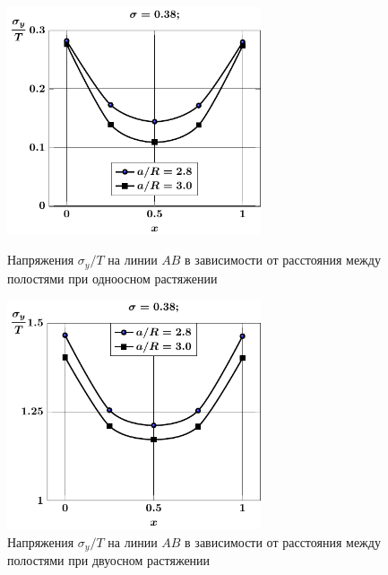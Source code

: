 \begin{figure}[h!]
\centering\footnotesize
\parbox[b]{7.5cm}{\centering\includegraphics[width=7.5cm]{periodic-spheres-cav27-a-t1-sig_y.pdf}
\caption{Напряжения $\sigma_y/T$ на линии $AB$ в зависимости от расстояния между полостями при одноосном растяжении
\label{f:11:6}}}\hfil\hfil
\parbox[b]{7.5cm}{\centering\includegraphics[width=7.5cm]{periodic-spheres-cav27-a-t2-sig_y.pdf}
\caption{Напряжения $\sigma_y/T$ на линии $AB$ в зависимости от расстояния между полостями при двуосном растяжении
\label{f:11:7}}}
\end{figure}

